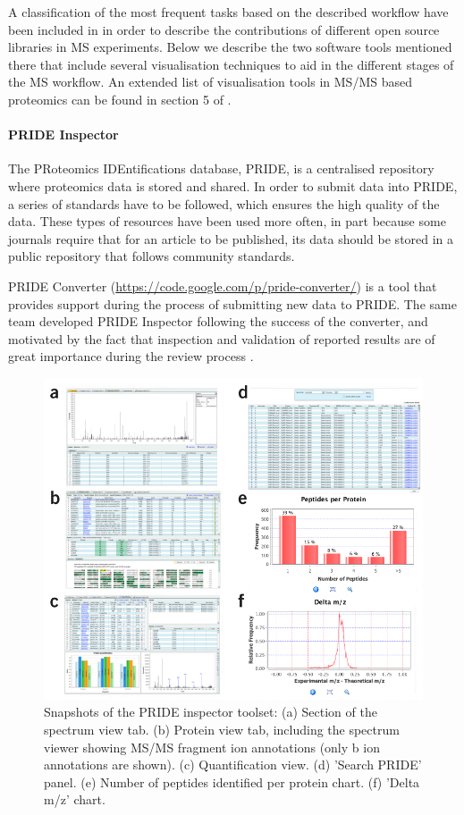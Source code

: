 A classification of the most frequent tasks based on the described workflow have been included in \cite{PER2014} in order to describe the contributions of different open source libraries in MS experiments. Below we describe the two software tools mentioned there that include several visualisation techniques to aid in the different stages of the MS workflow. An extended list of visualisation tools in MS/MS based proteomics can be found in section 5 of \cite{JAC2010}.

\paragraph{PRIDE Inspector}
The PRoteomics IDEntifications database, PRIDE, is a centralised repository where proteomics data is stored and shared. In order to submit data into PRIDE, a series of standards have to be followed, which ensures the high quality of the data. These types of resources have been used more often, in part because some journals require that for an article to be published, its data should be stored in a public repository that follows community standards.

PRIDE Converter (\url{https://code.google.com/p/pride-converter/}) is a tool that provides support during the process of submitting new data to PRIDE. The same team developed PRIDE Inspector following the success of the converter, and motivated by the fact that inspection and validation of reported results are of great importance during the review process \cite{WAN2012}.

\begin{figure}  
\centering
\includegraphics[width=\textwidth]{figures/prideinspector.png}
\caption[Snapshots of the PRIDE inspector toolset.]{Snapshots of the PRIDE inspector toolset: (a) Section of the spectrum view tab. (b) Protein view tab, including the spectrum viewer showing MS/MS fragment ion annotations (only b ion annotations are shown). (c) Quantification view. (d) 'Search PRIDE' panel. (e) Number of peptides identified per protein chart. (f) 'Delta m/z' chart.
\label{fig:pride}}
\end{figure}

